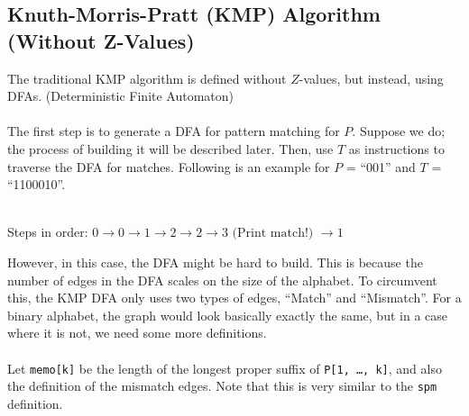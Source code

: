 \documentclass[10pt]{article}
\begin{document}
\subsection*{Knuth-Morris-Pratt (KMP) Algorithm (Without Z-Values)}
The traditional KMP algorithm is defined without $Z$-values, but instead, using DFAs.  (Deterministic Finite Automaton)\\\\
The first step is to generate a DFA for pattern matching for $P$.  Suppose we do; the process of building it will be described later.  Then, use $T$ as instructions to traverse the DFA for matches.  Following is an example for $P$ = ``001'' and $T$ = ``1100010''.
\begin{center}
\\
Steps in order: $0 \rightarrow 0 \rightarrow 1 \rightarrow 2 \rightarrow 2 \rightarrow 3 \text{ (Print match!) } \rightarrow 1$
\end{center}
However, in this case, the DFA might be hard to build.  This is because the number of edges in the DFA scales on the size of the alphabet.  To circumvent this, the KMP DFA only uses two types of edges, ``Match'' and ``Mismatch''.  For a binary alphabet, the graph would look basically exactly the same, but in a case where it is not, we need some more definitions.\\\\
Let \texttt{memo[k]} be the length of the longest proper suffix of \texttt{P[1, \dots, k]}, and also the definition of the mismatch edges.  Note that this is very similar to the \texttt{spm} definition.
\end{document}
